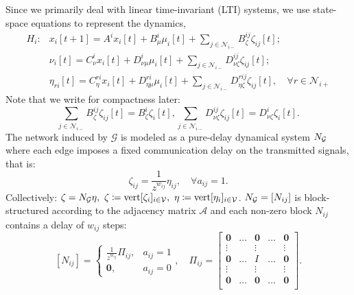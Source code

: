 Since we primarily deal with linear time-invariant (LTI) systems, we use state-space equations to represent the dynamics,
\begin{subequations}\label{eqn::delaynet_subsys}
\begin{align}
    H_i\colon & x_i[t+1]=  A^i x_i[t] + B_\mu^i \mu_i[t]  + \sum_{j\in \mathcal{N}_{i-}} B_\zeta^{ij} \zeta_{ij}[t]; \\
    & \nu_i[t] =  C_{\nu}^i x_i[t] + D_{\nu\mu}^i \mu_i[t] + \sum_{j\in \mathcal{N}_{i-}} D_{\nu\zeta}^{ij} \zeta_{ij}[t]; \\
    & \eta_{ri}[t]= C_\eta^{ri} x_i[t] + D_{\eta \mu}^{ri} \mu_i[t] + \sum_{j\in \mathcal{N}_{i-}} D_{\eta\zeta}^{rij} \zeta_{ij}[t],\quad \forall r\in \mathcal{N}_{i+}
\end{align}
\end{subequations}
Note that we write for compactness later:
\[
\sum_{j\in \mathcal{N}_{i-}} B_\zeta^{ij} \zeta_{ij}[t] = B_\zeta^{i} \zeta_{i}[t], 
\sum_{j\in \mathcal{N}_{i-}} D_{\nu\zeta}^{ij} \zeta_{ij}[t] = D_{\nu\zeta}^{i} \zeta_{i}[t].
\]
The network induced by \(\mathcal{G}\) is modeled as a pure-delay dynamical system \(N_{\cal G}\) where each edge imposes a fixed communication delay on the transmitted signals, that is:
\[
\zeta_{ij} = \frac{1}{z^{w_{ij}}} \eta_{ij},\quad \forall a_{ij} = 1.
\]
Collectively: \(
\zeta = N_{\cal G} \eta,\ \zeta \coloneqq {\mathrm{vert}}[\zeta_{i}]_{i \in \cal V},\ \eta \coloneqq  {\mathrm{vert}}[\eta_{i}]_{i \in \cal V}\).
\(N_{\cal G} = \left[N_{ij}\right]\) is block-structured according to the adjacency matrix \(\mathcal{A}\) and each non-zero block \(N_{ij}\) contains a delay of \(w_{ij}\) steps:
\[
\left[N_{ij}\right] = \begin{cases}
\frac{1}{z^{w_{ij}}} \Pi_{ij}, & a_{ij} = 1\\
\mathbf{0}, & a_{ij} = 0 
\end{cases},
\quad
\Pi_{ij} = \begin{bmatrix}
\mathbf{0} & \hdots & \mathbf{0} & \hdots & \mathbf{0} \\
\vdots &  & \vdots &  & \vdots \\
\mathbf{0} & \hdots & I & \hdots & \mathbf{0} \\
\vdots &  & \vdots &  & \vdots \\
\mathbf{0} & \hdots & \mathbf{0} & \hdots & \mathbf{0} \\
\end{bmatrix}.
\]
